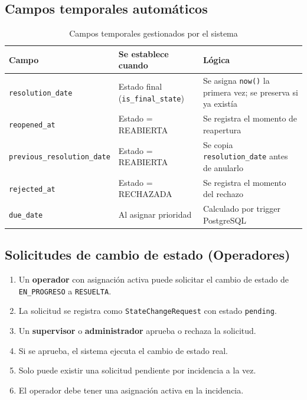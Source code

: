 \documentclass[11pt, a4paper]{article}
\begin{document}
\subsection{Campos temporales automáticos}

\begin{table}[H]
\centering
\begin{tabularx}{\textwidth}{l l X}
  \toprule
  \textbf{Campo} & \textbf{Se establece cuando} & \textbf{Lógica} \\
  \midrule
  \texttt{resolution\_date}           & Estado final (\texttt{is\_final\_state}) & Se asigna \texttt{now()} la primera vez; se preserva si ya existía \\
  \texttt{reopened\_at}               & Estado = REABIERTA  & Se registra el momento de reapertura \\
  \texttt{previous\_resolution\_date} & Estado = REABIERTA  & Se copia \texttt{resolution\_date} antes de anularlo \\
  \texttt{rejected\_at}               & Estado = RECHAZADA  & Se registra el momento del rechazo \\
  \texttt{due\_date}                  & Al asignar prioridad & Calculado por trigger PostgreSQL \\
  \bottomrule
\end{tabularx}
\caption{Campos temporales gestionados por el sistema}
\end{table}

\subsection{Solicitudes de cambio de estado (Operadores)}

\begin{reglanegocio}
\begin{enumerate}
  \item Un \textbf{operador} con asignación activa puede solicitar el cambio de estado de \texttt{EN\_PROGRESO} a \texttt{RESUELTA}.
  \item La solicitud se registra como \texttt{StateChangeRequest} con estado \texttt{pending}.
  \item Un \textbf{supervisor} o \textbf{administrador} aprueba o rechaza la solicitud.
  \item Si se aprueba, el sistema ejecuta el cambio de estado real.
  \item Solo puede existir una solicitud pendiente por incidencia a la vez.
  \item El operador debe tener una asignación activa en la incidencia.
\end{enumerate}
\end{reglanegocio}
\end{document}
